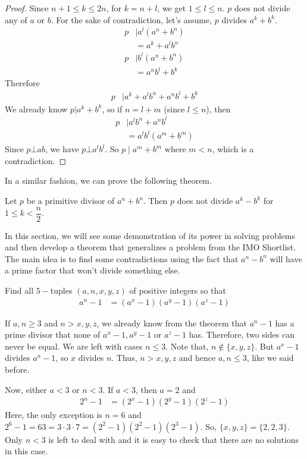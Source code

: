 	\begin{proof}
		Since $n+1\leq k\leq2n$, for $k=n+l$, we get $1\leq l\leq n$. $p$ does not divide any of $a$ or $b$. For the sake of contradiction, let's assume, $p$ divides $a^k+b^k$.
			\begin{align*}
				p
					& \mid a^l(a^n+b^n)\\
					& = a^k+a^lb^n\\
				p
					& \mid b^l(a^n+b^n)\\
					& = a^nb^l+b^k
			\end{align*}
		Therefore
		\begin{align*}
			p
				& \mid a^k+a^lb^n+a^nb^l+b^k
		\end{align*}
		We already know $p|a^k+b^k$, so if $n=l+m$ (since $l\leq n$), then
			\begin{align*}
				p
					& \mid a^lb^n+a^nb^l\\
					& = a^lb^l(a^m+b^m)
			\end{align*}
		Since $p\bot ab$, we have $p\bot a^lb^l$. So $p\mid a^m+b^m$ where $m< n$, which is a contradiction.
	\end{proof}
In a similar fashion, we can prove the following theorem.
	\begin{theorem}
		Let $p$ be a primitive divisor of $a^n+b^n$. Then $p$ does not divide $a^k-b^k$ for $1\leq k<\dfrac{n}{2}$.
	\end{theorem}

In this section, we will see some demonstration of its power in solving problems and then develop a theorem that generalizes a problem from the IMO Shortlist. The main idea is to find some contradictions using the fact that $a^n-b^n$ will have a prime factor that won't divide something else.
	\begin{problem}
		Find all $5-$tuples $(a,n,x,y,z)$ of positive integers so that
			\begin{align*}
				a^n-1 & = (a^x-1)(a^y-1)(a^z-1)
			\end{align*}
	\end{problem}

	\begin{solution}
		If $a,n\geq3$ and $n>x,y,z$, we already know from the theorem that $a^n-1$ has a prime divisor that none of $a^x-1,a^y-1$ or $a^z-1$ has. Therefore, two sides can never be equal. We are left with cases $n\leq3$. Note that, $n\notin\{x,y,z\}$. But $a^x-1$ divides $a^n-1$, so $x$ divides $n$. Thus, $n>x,y,z$ and hence $a,n\leq3$, like we said before.

		Now, either $a<3$ or $n<3$. If $a<3$, then $a=2$ and
			\begin{align*}
				2^n-1 & = (2^x-1)(2^y-1)(2^z-1)
			\end{align*}
		Here, the only exception is $n=6$ and $2^6-1=63=3\cdot3\cdot7=(2^2-1)(2^2-1)(2^3-1)$. So, $\{x,y,z\}=\{2,2,3\}$. Only $n<3$ is left to deal with and it is easy to check that there are no solutions in this case.
	\end{solution}

